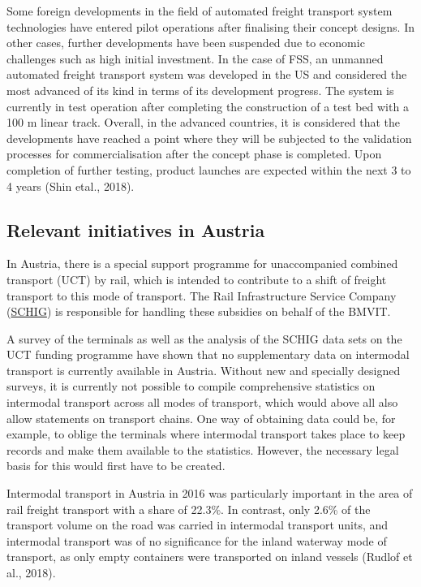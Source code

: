 \documentclass[
]{book}
\begin{document}
Some foreign developments in the field of automated freight transport system technologies have entered pilot operations after finalising their concept designs. In other cases, further developments have been suspended due to economic challenges such as high initial investment. In the case of FSS, an unmanned automated freight transport system was developed in the US and considered the most advanced of its kind in terms of its development progress. The system is currently in test operation after completing the construction of a test bed with a 100 m linear track. Overall, in the advanced countries, it is considered that the developments have reached a point where they will be subjected to the validation processes for commercialisation after the concept phase is completed. Upon completion of further testing, product launches are expected within the next 3 to 4 years (Shin etal., 2018).

\hypertarget{relevant-initiatives-in-austria-19}{%
\subsection*{Relevant initiatives in Austria}\label{relevant-initiatives-in-austria-19}}

In Austria, there is a special support programme for unaccompanied combined transport (UCT) by rail, which is intended to contribute to a shift of freight transport to this mode of transport. The Rail Infrastructure Service Company (\href{https://www.schig.com/}{SCHIG}) is responsible for handling these subsidies on behalf of the BMVIT.

A survey of the terminals as well as the analysis of the SCHIG data sets on the UCT funding programme have shown that no supplementary data on intermodal transport is currently available in Austria. Without new and specially designed surveys, it is currently not possible to compile comprehensive statistics on intermodal transport across all modes of transport, which would above all also allow statements on transport chains. One way of obtaining data could be, for example, to oblige the terminals where intermodal transport takes place to keep records and make them available to the statistics. However, the necessary legal basis for this would first have to be created.

Intermodal transport in Austria in 2016 was particularly important in the area of rail freight transport with a share of 22.3\%. In contrast, only 2.6\% of the transport volume on the road was carried in intermodal transport units, and intermodal transport was of no significance for the inland waterway mode of transport, as only empty containers were transported on inland vessels (Rudlof et al., 2018).
\end{document}
